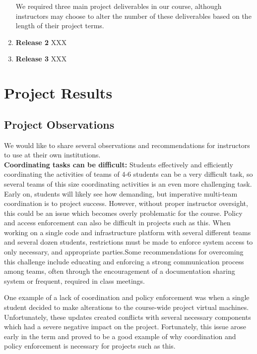 \documentclass{sig-alternate-05-2015}
\begin{document}
\begin{enumerate}
We required three main project deliverables in our course, although instructors may choose to alter the number of these deliverables based on the length of their project terms.
	
%		
	
	
	
	\item \textbf{Release 2} XXX
	\item \textbf{Release 3} XXX

\end{enumerate}


\section{Project Results}
\label{sec:projectresults}


\subsection{Project Observations}

We would like to share several observations and recommendations for instructors to use at their own institutions. \\

\noindent
\textbf{Coordinating tasks can be difficult:} Students effectively and efficiently coordinating the activities of teams of 4-6 students can be a very difficult task, so several teams of this size coordinating activities is an even more challenging task. Early on, students will likely see how demanding, but imperative multi-team coordination is to project success. However, without proper instructor oversight, this could be an issue which becomes overly problematic for the course. Policy and access enforcement can also be difficult in projects such as this. When working on a single code and infrastructure platform with several different teams and several dozen students, restrictions must be made to enforce system access to only necessary, and appropriate parties.Some recommendations for overcoming this challenge include educating and enforcing a strong communication process among teams, often through the encouragement of a documentation sharing system or frequent, required in class meetings. 

One example of a lack of coordination and policy enforcement was when a single student decided to make alterations to the course-wide project virtual machines. Unfortunately, these updates created conflicts with several necessary components which had a severe negative impact on the project. Fortunately, this issue arose early in the term and proved to be a good example of why coordination and policy enforcement is necessary for projects such as this.\\
\end{document}
